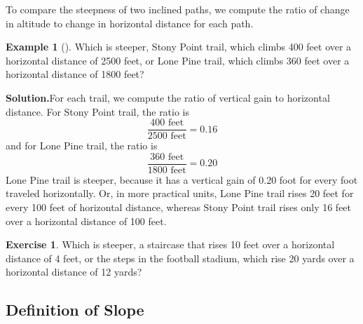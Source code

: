 \documentclass[10pt,]{book}
\theoremstyle{plain}
\theoremstyle{definition}
\theoremstyle{definition}
\theoremstyle{definition}
\newtheorem{example}[theorem]{Example}
\theoremstyle{definition}
\theoremstyle{definition}
\newtheorem{exercise}[theorem]{Exercise}
\numberwithin{equation}{section}
\begin{document}
\par
To compare the steepness of two inclined paths, we compute the ratio of change in
altitude to change in horizontal distance for each path.%
\begin{example}[]\label{example-steep-trail}
Which is steeper, Stony Point trail, which climbs 400 feet over a horizontal distance of 2500 feet, or Lone Pine trail, which climbs 360 feet over a horizontal distance of 1800 feet?%
\par\medskip\noindent%
\textbf{Solution.}\quad For each trail, we compute the ratio of vertical gain to horizontal distance. For Stony Point trail, the ratio is
    \begin{equation*}\frac{400 \text{ feet}}{2500 \text{ feet}}= 0.16 \end{equation*}  
    and for Lone Pine trail, the ratio is
    \begin{equation*}\frac{360 \text{ feet}}{1800 \text{ feet}}= 0.20 \end{equation*} 
    Lone Pine trail is steeper, because it has a vertical gain of 0.20 foot for every foot traveled horizontally. Or, in more practical units, Lone Pine trail rises 20 feet for every 100 feet of horizontal distance, whereas Stony Point trail rises only 16 feet over a horizontal distance of 100 feet.%
\end{example}
\begin{exercise}\label{exercise-steep-steps}
Which is steeper, a staircase that rises 10 feet over a horizontal distance of 4 feet, or the steps in the football stadium, which rise 20 yards over a horizontal distance of 12 yards?\end{exercise}
\typeout{************************************************}
\typeout{************************************************}
\subsection[Definition of Slope]{Definition of Slope}\label{subsection-19}
\end{document}
